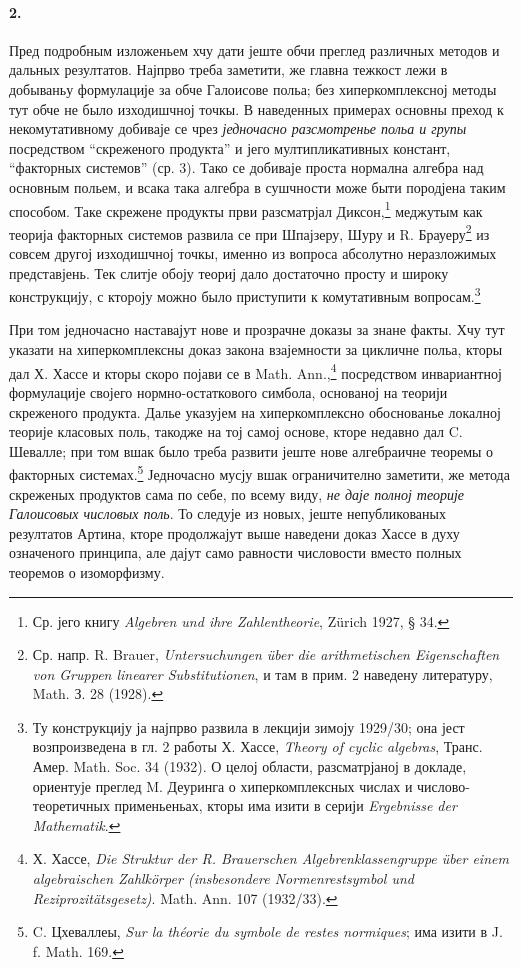 ﻿\documentclass[11pt]{article}
\newcommand{\foreign}[1]{#1}
\begin{document}
\paragraph{2.}
Пред подробным изложеньем хчу дати јеште обчи преглед различных методов и дальных резултатов. Најпрво треба заметити, же главна тежкост лежи в добываньу формулације за обче Галоисове польа; без хиперкомплексној методы тут обче не было изходишчној точкы. В наведенных примерах основны преход к некомутативному добиваје се чрез \emph{једночасно разсмотренье польа и групы} посредством ``скреженого продукта'' и јего мултипликативных констант, ``факторных системов'' (ср. 3). Тако се добиваје проста нормална алгебра над основным польем, и всака така алгебра в сушчности може быти породјена таким способом. Таке скрежене продукты први разсматрјал Диксон,\footnote{Ср. јего книгу \foreign{\emph{Algebren und ihre Zahlentheorie}}, Zürich 1927, § 34.} меджутым как теорија факторных системов развила се при Шпајзеру, Шуру и R. Брауеру\footnote{Ср. напр. R. Brauer, \foreign{\emph{Untersuchungen über die arithmetischen Eigenschaften von Gruppen linearer Substitutionen}}, и там в прим. 2 наведену литературу, Math. З. 28 (1928).} из совсем другој изходишчној точкы, именно из вопроса абсолутно неразложимых представјень. Тек слитје обоју теориј дало достаточно просту и широку конструкцију, с ктороју можно было приступити к комутативным вопросам.\footnote{Ту конструкцију ја најпрво развила в лекцији зимоју 1929/30; она јест возпроизведена в гл. 2 работы Х. Хассе, \foreign{\emph{Theory of cyclic algebras}}, Транс. Амер. Math. Soc. 34 (1932). О целој области, разсматрјаној в докладе, ориентује преглед M. Деуринга о хиперкомплексных числах и числово-теоретичных применьеньах, кторы има изити в серији \foreign{\emph{Ergebnisse der Mathematik}}.}

При том једночасно наставајут нове и прозрачне доказы за знане факты. Хчу тут указати на хиперкомплексны доказ закона взајемности за цикличне польа, кторы дал Х. Хассе и кторы скоро појави се в \foreign{Math. Ann.},\footnote{Х. Хассе, \foreign{\emph{Die Struktur der R. Brauerschen Algebrenklassengruppe über einem algebraischen Zahlkörper (insbesondere Normenrestsymbol und Reziprozitätsgesetz)}}. Math. Ann. 107 (1932/33).} посредством инвариантној формулације својего нормно-остаткового симбола, основаној на теорији скреженого продукта. Далье указујем на хиперкомплексно обоснованье локалној теорије класовых поль, такодже на тој самој основе, кторе недавно дал C. Шевалле; при том вшак было треба развити јеште нове алгебраичне теоремы о факторных системах.\footnote{C. Цхеваллеы, \foreign{\emph{Sur la théorie du symbole de restes normiques}}; има изити в J. f. Math. 169.} Једночасно мусју вшак ограничително заметити, же метода скреженых продуктов сама по себе, по всему виду, \emph{не даје полној теорије Галоисовых числовых поль}. То следује из новых, јеште непубликованых резултатов Артина, кторе продолжајут выше наведени доказ Хассе в духу означеного принципа, але дајут само равности числовости вместо полных теоремов о изоморфизму.
\end{document}

